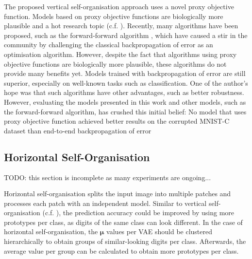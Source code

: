 The proposed vertical self-organisation approach uses a novel proxy objective function. Models based on proxy objective functions are biologically more plausible and a hot research topic (c.f. ). Recently, many algorithms have been proposed, such as the forward-forward algorithm , which have caused a stir in the community by challenging the classical backpropagation of error as an optimisation algorithm. However, despite the fact that algorithms using proxy objective functions are biologically more plausible, these algorithms do not provide many benefits yet. Models trained with backpropagation of error are still superior, especially on well-known tasks such as classification. One of the author's hope was that such algorithms have other advantages, such as better robustness. However, evaluating the models presented in this work and other models, such as the forward-forward algorithm, has crushed this initial belief: No model that uses proxy objective function achieved better results on the corrupted MNIST-C dataset than end-to-end backpropagation of error


\subsection{Horizontal Self-Organisation}
TODO: this section is incomplete as many experiments are ongoing...

Horizontal self-organisation splits the input image into multiple patches and processes each patch with an independent model.
Similar to vertical self-organisation (c.f. ), the prediction accuracy could be improved by using more prototypes per class, as digits of the same class can look different. In the case of horizontal self-organisation, the $\boldsymbol{\mu}$ values per VAE should be clustered hierarchically to obtain groups of similar-looking digits per class. Afterwards, the average value per group can be calculated to obtain more prototypes per class.

